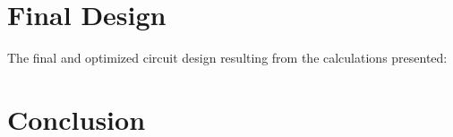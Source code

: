 \documentclass[]{article}
\begin{document}
\pagebreak

\section*{Final Design}
{
	The final and optimized circuit design resulting from the calculations presented:
	\\
}

\section*{Conclusion}
{
}

\pagebreak




\end{document}
